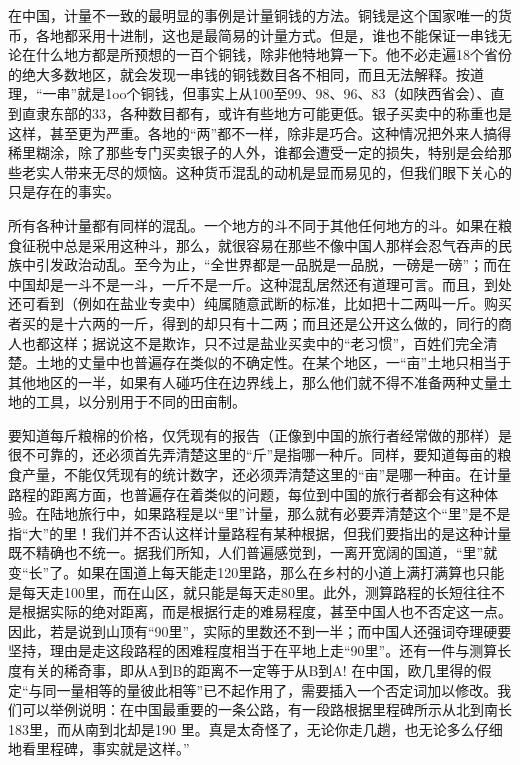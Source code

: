 \documentclass[12pt,oneside]{book}
\begin{document}
\begin{common-format}
在中国，计量不一致的最明显的事例是计量铜钱的方法。铜钱是这个国家唯一的货币，各地都采用十进制，这也是最简易的计量方式。但是，谁也不能保证一串钱无论在什么地方都是所预想的一百个铜钱，除非他特地算一下。他不必走遍18个省份的绝大多数地区，就会发现一串钱的铜钱数目各不相同，而且无法解释。按道理，“一串”就是1oo个铜钱，但事实上从100至99、98、96、83（如陕西省会）、直到直隶东部的33，各种数目都有，或许有些地方可能更低。银子买卖中的称重也是这样，甚至更为严重。各地的“两”都不一样，除非是巧合。这种情况把外来人搞得稀里糊涂，除了那些专门买卖银子的人外，谁都会遭受一定的损失，特别是会给那些老实人带来无尽的烦恼。这种货币混乱的动机是显而易见的，但我们眼下关心的只是存在的事实。 

所有各种计量都有同样的混乱。一个地方的斗不同于其他任何地方的斗。如果在粮食征税中总是采用这种斗，那么，就很容易在那些不像中国人那样会忍气吞声的民族中引发政治动乱。至今为止，“全世界都是一品脱是一品脱，一磅是一磅”；而在中国却是一斗不是一斗，一斤不是一斤。这种混乱居然还有道理可言。而且，到处还可看到（例如在盐业专卖中）纯属随意武断的标准，比如把十二两叫一斤。购买者买的是十六两的一斤，得到的却只有十二两；而且还是公开这么做的，同行的商人也都这样；据说这不是欺诈，只不过是盐业买卖中的“老习惯”，百姓们完全清楚。土地的丈量中也普遍存在类似的不确定性。在某个地区，一“亩”土地只相当于其他地区的一半，如果有人碰巧住在边界线上，那么他们就不得不准备两种丈量土地的工具，以分别用于不同的田亩制。 

要知道每斤粮棉的价格，仅凭现有的报告（正像到中国的旅行者经常做的那样）是很不可靠的，还必须首先弄清楚这里的“斤”是指哪一种斤。同样，要知道每亩的粮食产量，不能仅凭现有的统计数字，还必须弄清楚这里的“亩”是哪一种亩。在计量路程的距离方面，也普遍存在着类似的问题，每位到中国的旅行者都会有这种体验。在陆地旅行中，如果路程是以“里”计量，那么就有必要弄清楚这个“里”是不是指“大”的里！我们并不否认这样计量路程有某种根据，但我们要指出的是这种计量既不精确也不统一。据我们所知，人们普遍感觉到，一离开宽阔的国道，“里”就变“长”了。如果在国道上每天能走120里路，那么在乡村的小道上满打满算也只能是每天走100里，而在山区，就只能是每天走80里。此外，测算路程的长短往往不是根据实际的绝对距离，而是根据行走的难易程度，甚至中国人也不否定这一点。因此，若是说到山顶有“90里”，实际的里数还不到一半；而中国人还强词夺理硬要坚持，理由是走这段路程的困难程度相当于在平地上走“90里”。还有一件与测算长度有关的稀奇事，即从A到B的距离不一定等于从B到A! 在中国，欧几里得的假定“与同一量相等的量彼此相等”已不起作用了，需要插入一个否定词加以修改。我们可以举例说明：在中国最重要的一条公路，有一段路根据里程碑所示从北到南长183里，而从南到北却是190 里。真是太奇怪了，无论你走几趟，也无论多么仔细地看里程碑，事实就是这样。”


\end{common-format}
\end{document}
